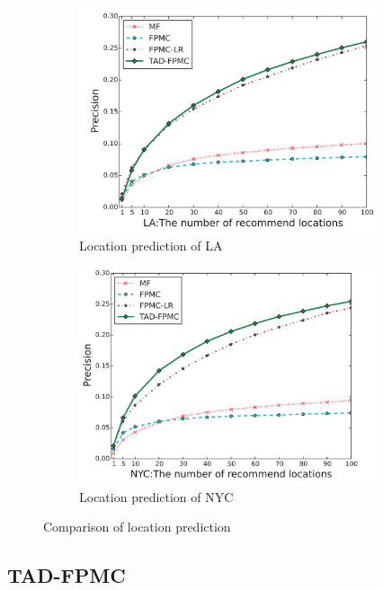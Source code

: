 \documentclass{sig-alternate}
\begin{document}
\begin{figure}
\begin{subfigure}{.5\textwidth}
  \centering
  \includegraphics[width=0.96\textwidth]{LA_ex.png}
  \caption{Location prediction of LA}
  \label{fig:ex_LA}
\end{subfigure}%
\begin{subfigure}{.5\textwidth}
  \centering
  \includegraphics[width=0.96\textwidth]{NYC_ex.png}
  \caption{Location prediction of NYC}
  \label{fig:ex_NYC}
\end{subfigure}
\caption{Comparison of location prediction}
\label{fig:ex}
\end{figure}

\subsection{TAD-FPMC}
\label{sec:typeChangesSpecialChars}
\end{document}
